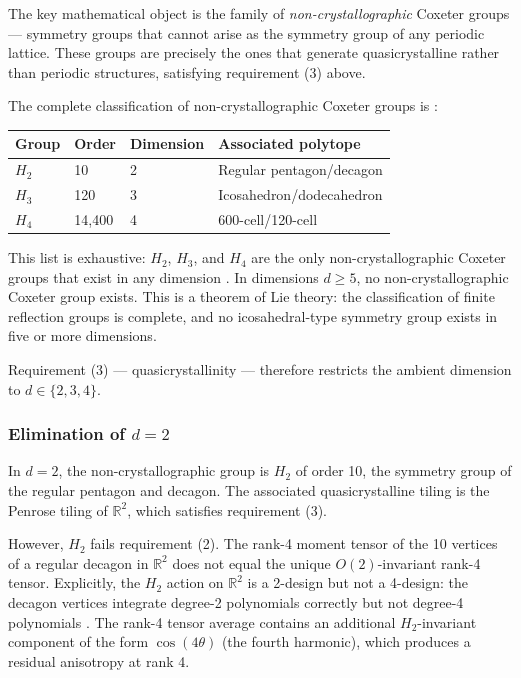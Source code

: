 \documentclass[11pt,letterpaper]{article}
\begin{document}
The key mathematical object is the family of \emph{non-crystallographic} 
Coxeter groups — symmetry groups that cannot arise as the symmetry group 
of any periodic lattice. These groups are precisely the ones that 
generate quasicrystalline rather than periodic structures, satisfying 
requirement (3) above.

The complete classification of non-crystallographic Coxeter groups is 
\cite{humphreys1990}:

\begin{center}
\begin{tabular}{llll}
\toprule
Group & Order & Dimension & Associated polytope \\
\midrule
$H_2$ & 10 & 2 & Regular pentagon/decagon \\
$H_3$ & 120 & 3 & Icosahedron/dodecahedron \\
$H_4$ & 14,400 & 4 & 600-cell/120-cell \\
\bottomrule
\end{tabular}
\end{center}

This list is exhaustive: $H_2$, $H_3$, and $H_4$ are the only 
non-crystallographic Coxeter groups that exist in any dimension 
\cite{humphreys1990}. In dimensions $d \geq 5$, no non-crystallographic 
Coxeter group exists. This is a theorem of Lie theory: the 
classification of finite reflection groups is complete, and no 
icosahedral-type symmetry group exists in five or more dimensions.

Requirement (3) — quasicrystallinity — therefore restricts the 
ambient dimension to $d \in \{2, 3, 4\}$.

\subsubsection{Elimination of $d = 2$}

In $d = 2$, the non-crystallographic group is $H_2$ of order 10, 
the symmetry group of the regular pentagon and decagon. The 
associated quasicrystalline tiling is the Penrose tiling of 
$\mathbb{R}^2$, which satisfies requirement (3).

However, $H_2$ fails requirement (2). The rank-4 moment tensor of 
the 10 vertices of a regular decagon in $\mathbb{R}^2$ does not 
equal the unique $O(2)$-invariant rank-4 tensor. Explicitly, the 
$H_2$ action on $\mathbb{R}^2$ is a 2-design but not a 4-design: 
the decagon vertices integrate degree-2 polynomials correctly but 
not degree-4 polynomials \cite{bannai1979}. The rank-4 tensor 
average contains an additional $H_2$-invariant component of the 
form $\cos(4\theta)$ (the fourth harmonic), which produces a 
residual anisotropy at rank 4.
\end{document}
